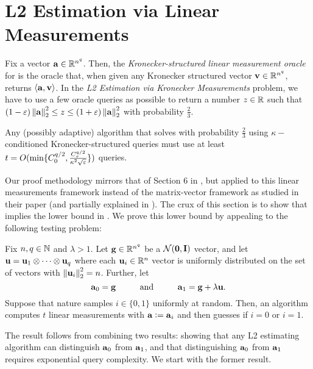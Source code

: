 

\section{L2 Estimation via Linear Measurements}
\label{app:l2-estimation-formal-lower}

\begin{problem}
    \label{prob:l2-estimation}
    Fix a vector \(\boldsymbol{\mathrm{a}}\in{\mathbb R}^{n^q}\).
    Then, the \emph{Kronecker-structured linear measurement oracle} for \va is the oracle that, when given any Kronecker structured vector \(\boldsymbol{\mathrm{v}}\in{\mathbb R}^{n^q}\), returns \(\langle \boldsymbol{\mathrm{a}}, \boldsymbol{\mathrm{v}}\rangle\).
    In the \emph{L2 Estimation via Kronecker Measurements} problem, we have to use a few oracle queries as possible to return a number \(z\in{\mathbb R}\) such that \((1-\eps)\norm\va_2^2 \leq z \leq (1+\eps)\norm\va_2^2\) with probability \(\frac23\).
\end{problem}


\begin{theorem}
    \label{thm:l2-adaptive-estimation-lower-bound}
    Any (possibly adaptive) algorithm \cA that solves  with probability \(\frac23\) using \(\kappa-\)conditioned Kronecker-structured queries must use at least \(t = O(\min\{C_0^{q/2}, \frac{C_\tau^{q/2}}{\kappa^2 \sqrt{\varepsilon}}\})\) queries.
\end{theorem}


Our proof methodology mirrors that of Section 6 in \cite{simchowitz2017gap}, but applied to this linear measurements framework instead of the matrix-vector framework as studied in their paper (and partially explained in ).
The crux of this section is to show that  implies the lower bound in .
We prove this lower bound by appealing to the following testing problem:

\begin{problem}
    \label{prob:l2-estimation-instance}
    Fix \(n,q\in{\mathbb N}\) and \(\lambda > 1\).
    Let \(\boldsymbol{\mathrm{g}}\in{\mathbb R}^{n^q}\) be a \({\mathcal N}(\boldsymbol{\mathrm{0}},\mathbf{I})\) vector, and let \(\boldsymbol{\mathrm{u}} = \boldsymbol{\mathrm{u}}_1\otimes \cdots \otimes \boldsymbol{\mathrm{u}}_q\) where each \(\boldsymbol{\mathrm{u}}_i \in {\mathbb R}^n\) vector is uniformly distributed on the set of vectors with \(\norm{\vu_i}_2^2 = n\).
    Further, let
    \[
        \boldsymbol{\mathrm{a}}_0 = \boldsymbol{\mathrm{g}}
        \hspace{1cm}\text{and}\hspace{1cm}
        \boldsymbol{\mathrm{a}}_1 = \boldsymbol{\mathrm{g}} + \lambda\boldsymbol{\mathrm{u}}.
    \]
    Suppose that nature samples \(i \in \{0,1\}\) uniformly at random.
    Then, an algorithm \cA computes \(t\) linear measurements with \(\boldsymbol{\mathrm{a}} \;{\vcentcolon=}\; \boldsymbol{\mathrm{a}}_i\) and then guesses if \(i=0\) or \(i=1\).
\end{problem}
The result  follows from combining two results: showing that any L2 estimating algorithm can distinguish \(\boldsymbol{\mathrm{a}}_0\) from \(\boldsymbol{\mathrm{a}}_1\), and that distinguishing \(\boldsymbol{\mathrm{a}}_0\) from \(\boldsymbol{\mathrm{a}}_1\) requires exponential query complexity.
We start with the former result.


